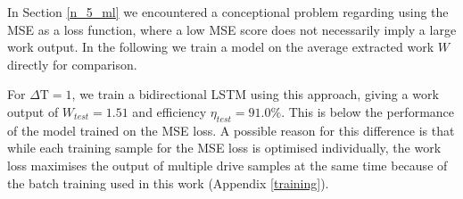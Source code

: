 In Section \ref{n_5_ml} we encountered a conceptional problem regarding using the MSE as a loss function, where a low MSE score does not necessarily imply a large work output.
In the following we train a model on the average extracted work $W$ directly for comparison.

For $\Delta \mathrm{T} = 1$, we train a bidirectional LSTM using this approach, giving a work output of $W_{test} = 1.51$ and efficiency $\eta_{test} = 91.0 \%$.
This is below the performance of the model trained on the MSE loss.
A possible reason for this difference is that while each training sample for the MSE loss is optimised individually, the work loss maximises the output of multiple drive samples at the same time because of the batch training used in this work (Appendix \ref{training}).